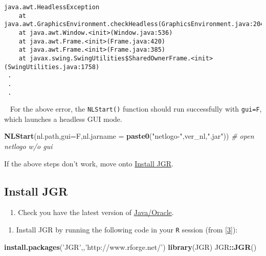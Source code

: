 \documentclass[10,portrait]{article}
\newenvironment{Shaded}{\begin{snugshade}}{\end{snugshade}}
\newcommand{\KeywordTok}[1]{\textcolor[rgb]{0.13,0.29,0.53}{\textbf{#1}}}
\newcommand{\DataTypeTok}[1]{\textcolor[rgb]{0.13,0.29,0.53}{#1}}
\newcommand{\StringTok}[1]{\textcolor[rgb]{0.31,0.60,0.02}{#1}}
\newcommand{\CommentTok}[1]{\textcolor[rgb]{0.56,0.35,0.01}{\textit{#1}}}
\newcommand{\OperatorTok}[1]{\textcolor[rgb]{0.81,0.36,0.00}{\textbf{#1}}}
\newcommand{\NormalTok}[1]{#1}
\providecommand{\tightlist}{%
  \setlength{\itemsep}{0pt}\setlength{\parskip}{0pt}}
\begin{document}
\begin{verbatim}
java.awt.HeadlessException
    at java.awt.GraphicsEnvironment.checkHeadless(GraphicsEnvironment.java:204)
    at java.awt.Window.<init>(Window.java:536)
    at java.awt.Frame.<init>(Frame.java:420)
    at java.awt.Frame.<init>(Frame.java:385)
    at javax.swing.SwingUtilities$SharedOwnerFrame.<init>(SwingUtilities.java:1758)  
 .   
 .  
 .  
\end{verbatim}

~ For the above error, the \texttt{NLStart()} function should run
successfully with \texttt{gui=F}, which launches a headless GUI mode. ~

\begin{Shaded}
\begin{Highlighting}[]
\KeywordTok{NLStart}\NormalTok{(nl.path,}\DataTypeTok{gui=}\NormalTok{F,}\DataTypeTok{nl.jarname =} \KeywordTok{paste0}\NormalTok{(}\StringTok{"netlogo-"}\NormalTok{,ver_nl,}\StringTok{".jar"}\NormalTok{)) }\CommentTok{# open netlogo w/o gui}
\end{Highlighting}
\end{Shaded}

If the above steps don't work, move onto
\protect\hyperlink{install-jgr}{Install JGR}.

\hypertarget{install-jgr}{\subsection{Install JGR}\label{install-jgr}}

~ 1. Check you have the latest version of
\href{https://www.oracle.com/technetwork/java/javase/downloads/index-jsp-138363.html}{Java/Oracle}.

\begin{enumerate}
\def\labelenumi{\arabic{enumi}.}
\setcounter{enumi}{1}
\tightlist
\item
  Install JGR by running the following code in your \texttt{R} session
  (from \protect\hyperlink{references}{{[}3{]}}): ~
\end{enumerate}

\begin{Shaded}
\begin{Highlighting}[]
\KeywordTok{install.packages}\NormalTok{(}\StringTok{'JGR'}\NormalTok{,,}\StringTok{'http://www.rforge.net/'}\NormalTok{)}
\KeywordTok{library}\NormalTok{(JGR)}
\NormalTok{JGR}\OperatorTok{::}\KeywordTok{JGR}\NormalTok{()}
\end{Highlighting}
\end{Shaded}
\end{document}
